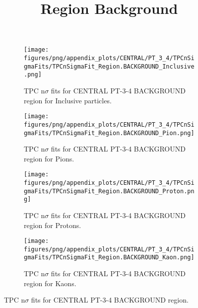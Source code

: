             \begin{figure}[H]
                \title{Region Background}
                \begin{subfigure}[b]{0.5\textwidth}
                    \centering
                    \texttt{[image: figures/png/appendix\_plots/CENTRAL/PT\_3\_4/TPCnSigmaFits/TPCnSigmaFit\_Region.BACKGROUND\_Inclusive.png]}
                    \caption{TPC n$\sigma$ fits for CENTRAL PT-3-4 BACKGROUND region for Inclusive particles.}
                    \label{fig:appendix_CENTRAL_PT-3-4_BACKGROUND_Inclusive}
                \end{subfigure}
                \begin{subfigure}[b]{0.5\textwidth}
                    \centering
                    \texttt{[image: figures/png/appendix\_plots/CENTRAL/PT\_3\_4/TPCnSigmaFits/TPCnSigmaFit\_Region.BACKGROUND\_Pion.png]}
                    \caption{TPC n$\sigma$ fits for CENTRAL PT-3-4 BACKGROUND region for Pions.}
                    \label{fig:appendix_CENTRAL_PT-3-4_BACKGROUND_Pion}
                \end{subfigure}
                \begin{subfigure}[b]{0.5\textwidth}
                    \centering
                    \texttt{[image: figures/png/appendix\_plots/CENTRAL/PT\_3\_4/TPCnSigmaFits/TPCnSigmaFit\_Region.BACKGROUND\_Proton.png]}
                    \caption{TPC n$\sigma$ fits for CENTRAL PT-3-4 BACKGROUND region for Protons.}
                    \label{fig:appendix_CENTRAL_PT-3-4_BACKGROUND_Proton}
                \end{subfigure}
                \begin{subfigure}[b]{0.5\textwidth}
                    \centering
                    \texttt{[image: figures/png/appendix\_plots/CENTRAL/PT\_3\_4/TPCnSigmaFits/TPCnSigmaFit\_Region.BACKGROUND\_Kaon.png]}
                    \caption{TPC n$\sigma$ fits for CENTRAL PT-3-4 BACKGROUND region for Kaons.}
                    \label{fig:appendix_CENTRAL_PT-3-4_BACKGROUND_Kaon}
                \end{subfigure}
                \caption{TPC n$\sigma$ fits for CENTRAL PT-3-4 BACKGROUND region.}
                \label{fig:appendix_CENTRAL_PT-3-4_BACKGROUND}
            \end{figure}
            \clearpage
            
    
